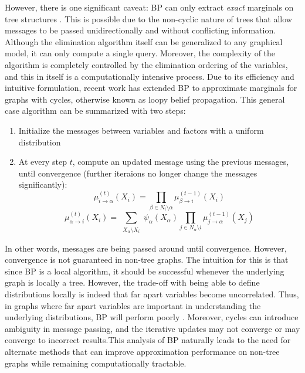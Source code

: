 \documentclass{article}
\begin{document}
However, there is one significant caveat: BP can only extract \textit{exact} marginals on tree structures \cite{bp_book}. This is possible due to the non-cyclic nature of trees that allow messages to be passed unidirectionally and without conflicting information. Although the elimination algorithm itself can be generalized to any graphical model, it can only compute a single query. Moreover, the complexity of the algorithm is completely controlled by the elimination ordering of the variables, and this in itself is a computationally intensive process. Due to its efficiency and intuitive formulation, recent work has extended BP to approximate marginals for graphs with cycles, otherwise known as loopy belief propagation. This general case algorithm can be summarized with two steps:
\begin{enumerate}
    \item Initialize the messages between variables and factors with a uniform distribution 
    \item At every step $t$, compute an updated message using the previous messages, until convergence (further iteraions no longer change the messages significantly):
        \begin{equation}
        \mu_{i \to \alpha}^{(t)}(X_i) = \prod_{\beta \in N_i \setminus \alpha} \mu_{\beta \to i}^{(t-1)}(X_i)
        \end{equation}
        \begin{equation}
        \mu_{\alpha \to i}^{(t)}(X_i) = \sum_{\substack{X_{\alpha} \setminus X_i}} \psi_{\alpha}(X_{\alpha}) \prod_{j \in N_\alpha \setminus i} \mu_{j \to \alpha}^{(t-1)}(X_j)
        \end{equation}
\end{enumerate}

In other words, messages are being passed around until convergence. However, convergence is not guaranteed in non-tree graphs. The intuition for this is that since BP is a local algorithm, it should be successful whenever the underlying graph is locally a tree. However, the trade-off with being able to define distributions locally is indeed that far apart variables become uncorrelated. Thus, in graphs where far apart variables are important in understanding the underlying distributions, BP will perform poorly \cite{bp_book}. Moreover, cycles  can introduce ambiguity in message passing, and the iterative updates may not converge or may converge to incorrect results.This analysis of BP naturally leads to the need for alternate methods that can improve approximation performance on non-tree graphs while remaining computationally tractable. 
\end{document}

